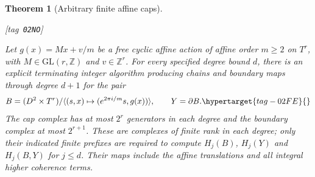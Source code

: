 \documentclass[11pt,a4paper]{article}
\numberwithin{equation}{section}
\newtheorem{theorem}{Theorem}[section]
\theoremstyle{definition}
\newcommand{\StatementRecord}[4]{{\upshape\footnotesize[tag~\texttt{#3}]}\enspace\ignorespaces}
\begin{document}
\begin{theorem}[Arbitrary finite affine caps]\hypertarget{tag-02NO}{}\label{maps:src:F.2.33}
\StatementRecord{maps:src:F.2.33}{proved}{02NO}{\cref{maps:src:F.2.31}}


Let $g(x)=Mx+v/m$ be a free cyclic affine action of affine order
$m\geq2$ on $T^r$, with $M\in\mathrm{GL}(r,\mathbb Z)$ and
$v\in\mathbb Z^r$.  For every specified degree bound $d$, there is
an explicit terminating integer algorithm producing chains and
boundary maps through degree $d+1$ for the pair
\begin{equation}
 B=(D^2\times T^r)/\langle(s,x)\mapsto
 (e^{2\pi i/m}s,g(x))\rangle,
 \qquad Y=\partial B.                                      \hypertarget{tag-02FE}{}\label{maps:eq:F.CA1}
\end{equation}
The cap complex has at most $2^r$ generators in each degree and
the boundary complex at most $2^{r+1}$.  These are complexes of
finite rank in each degree; only their indicated finite prefixes
are required to compute $H_j(B)$, $H_j(Y)$ and $H_j(B,Y)$ for
$j\leq d$.  Their maps include the affine translations and all integral higher coherence terms.

\end{theorem}
\end{document}
